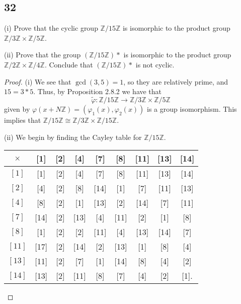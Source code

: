 \documentclass{article}
\newcommand{\Z}{\mathbb{Z}}
\newenvironment{hwproof}[1]
{
    #1
    \begin{proof}
}{
    \end{proof}
}
\begin{document}
\subsection*{32}
\begin{hwproof}
    {
        (i) Prove that the cyclic group $\Z / 15\Z$ is isomorphic to the
        product group $\Z / 3\Z \times \Z / 5\Z$.

        (ii) Prove that the group $(\Z / 15\Z)*$ is isomorphic to the product group
        $\Z / 2\Z \times \Z / 4\Z$. Conclude that $(\Z / 15\Z)*$ is not cyclic.
    }
    (i) We see that $\gcd(3,5) = 1$, so they are relatively prime, and $15=3*5$.
    Thus, by Proposition 2.8.2 we have that
    \begin{equation*}
        \tilde{\varphi}: \Z / 15\Z \to \Z / 3\Z \times \Z / 5\Z
    \end{equation*}
    given by $\varphi(x + N\Z) = (\varphi_1(x), \varphi_2(x))$ is a group isomorphism.
    This implies that $\Z / 15\Z \cong \Z / 3\Z \times \Z / 15\Z$.

    (ii)
    We begin by finding the Cayley table for $\Z / 15\Z$.
    \begin{center}
        \begin{tabular}{c | c  c  c  c  c  c  c  c }
            $\times$ & [1]  & [2] & [4]  & [7]  & [8]  & [11] & [13] & [14] \\
            \hline
            $[1]$    & [1]  & [2] & [4]  & [7]  & [8]  & [11] & [13] & [14] \\
            $[2]$    & [4]  & [2] & [8]  & [14] & [1]  & [7]  & [11] & [13] \\
            $[4]$    & [8]  & [2] & [1]  & [13] & [2]  & [14] & [7]  & [11] \\
            $[7]$    & [14] & [2] & [13] & [4]  & [11] & [2]  & [1]  & [8]  \\
            $[8]$    & [1]  & [2] & [2]  & [11] & [4]  & [13] & [14] & [7]  \\
            $[11]$   & [17] & [2] & [14] & [2]  & [13] & [1]  & [8]  & [4]  \\
            $[13]$   & [11] & [2] & [7]  & [1]  & [14] & [8]  & [4]  & [2]  \\
            $[14]$   & [13] & [2] & [11] & [8]  & [7]  & [4]  & [2]  & [1]. \\
        \end{tabular}
    \end{center}


\end{hwproof}
\end{document}
